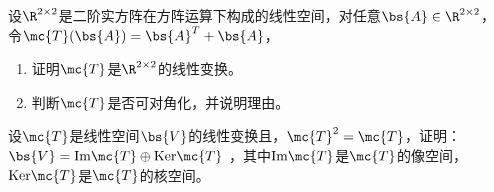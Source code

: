 \documentclass[12pt, a4paper, oneside, UTF8]{ctexbook}
\begin{document}
\begin{question}
    设$\R^{2\times 2}$是二阶实方阵在方阵运算下构成的线性空间，对任意$\bs{A}\in \R^{2\times 2}$，
    令$\mc{T}(\bs{A})=\bs{A}^T+\bs{A}$，
    \begin{enumerate}[label=(\arabic{*})]
        \item 证明$\mc{T}$是$\R^{2\times 2}$的线性变换。
        \item 判断$\mc{T}$是否可对角化，并说明理由。
    \end{enumerate}
\end{question}

\begin{question}
    设$\mc{T}$是线性空间$\bs{V}$的线性变换且，$\mc{T}^2=\mc{T}$，证明：$\bs{V}=\mathrm{Im}\mc{T}\oplus \mathrm{Ker}\mc{T}$
，其中$\mathrm{Im}\mc{T}$是$\mc{T}$的像空间，$\mathrm{Ker}\mc{T}$是$\mc{T}$的核空间。
\end{question}

\ifx\allfiles\undefined
\end{document}
